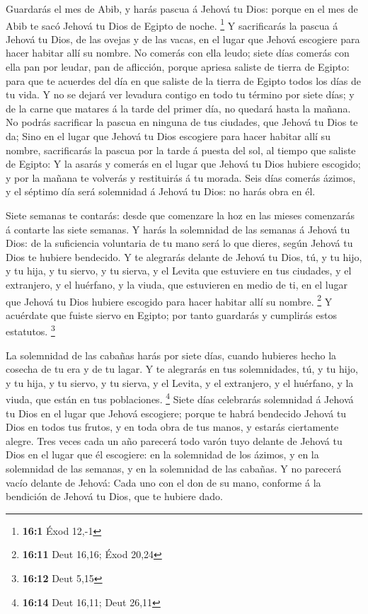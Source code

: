  Guardarás el mes de Abib, y harás pascua á Jehová tu
Dios: porque en el mes de Abib te sacó Jehová tu Dios de Egipto de
noche. \footnote{\textbf{16:1} Éxod 12,-1}  Y sacrificarás
la pascua á Jehová tu Dios, de las ovejas y de las vacas, en el lugar
que Jehová escogiere para hacer habitar allí su nombre. 
No comerás con ella leudo; siete días comerás con ella pan por leudar,
pan de aflicción, porque apriesa saliste de tierra de Egipto: para que
te acuerdes del día en que saliste de la tierra de Egipto todos los días
de tu vida.  Y no se dejará ver levadura contigo en todo
tu término por siete días; y de la carne que matares á la tarde del
primer día, no quedará hasta la mañana.  No podrás
sacrificar la pascua en ninguna de tus ciudades, que Jehová tu Dios te
da;  Sino en el lugar que Jehová tu Dios escogiere para
hacer habitar allí su nombre, sacrificarás la pascua por la tarde á
puesta del sol, al tiempo que saliste de Egipto:  Y la
asarás y comerás en el lugar que Jehová tu Dios hubiere escogido; y por
la mañana te volverás y restituirás á tu morada.  Seis
días comerás ázimos, y el séptimo día será solemnidad á Jehová tu Dios:
no harás obra en él.

 Siete semanas te contarás: desde que comenzare la hoz en
las mieses comenzarás á contarte las siete semanas.  Y
harás la solemnidad de las semanas á Jehová tu Dios: de la suficiencia
voluntaria de tu mano será lo que dieres, según Jehová tu Dios te
hubiere bendecido.  Y te alegrarás delante de Jehová tu
Dios, tú, y tu hijo, y tu hija, y tu siervo, y tu sierva, y el Levita
que estuviere en tus ciudades, y el extranjero, y el huérfano, y la
viuda, que estuvieren en medio de ti, en el lugar que Jehová tu Dios
hubiere escogido para hacer habitar allí su nombre. \footnote{\textbf{16:11}
  Deut 16,16; Éxod 20,24}  Y acuérdate que fuiste siervo
en Egipto; por tanto guardarás y cumplirás estos estatutos. \footnote{\textbf{16:12}
  Deut 5,15}

 La solemnidad de las cabañas harás por siete días,
cuando hubieres hecho la cosecha de tu era y de tu lagar.
 Y te alegrarás en tus solemnidades, tú, y tu hijo, y tu
hija, y tu siervo, y tu sierva, y el Levita, y el extranjero, y el
huérfano, y la viuda, que están en tus poblaciones. \footnote{\textbf{16:14}
  Deut 16,11; Deut 26,11}  Siete días celebrarás
solemnidad á Jehová tu Dios en el lugar que Jehová escogiere; porque te
habrá bendecido Jehová tu Dios en todos tus frutos, y en toda obra de
tus manos, y estarás ciertamente alegre.  Tres veces cada
un año parecerá todo varón tuyo delante de Jehová tu Dios en el lugar
que él escogiere: en la solemnidad de los ázimos, y en la solemnidad de
las semanas, y en la solemnidad de las cabañas. Y no parecerá vacío
delante de Jehová:  Cada uno con el don de su mano,
conforme á la bendición de Jehová tu Dios, que te hubiere dado.


